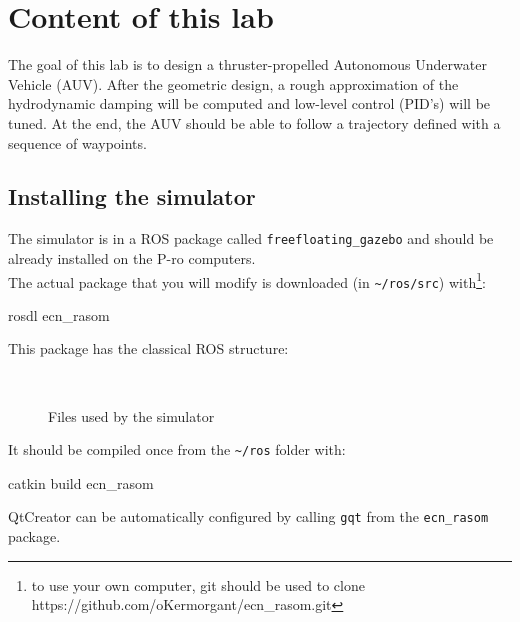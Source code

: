 \documentclass{ecnreport}
\begin{document}


\section{Content of this lab}

The goal of this lab is to design a thruster-propelled Autonomous Underwater Vehicle (AUV). After the geometric design, a rough approximation of the hydrodynamic damping will be computed
and low-level control (PID's) will be tuned. At the end, the AUV should be able to follow a trajectory defined with a sequence of waypoints.

\subsection{Installing the simulator}

The simulator is in a ROS package called \texttt{freefloating\_gazebo} and should be already installed on the P-ro computers.\\
The actual package that you will modify is downloaded (in \texttt{\~{}/ros/src}) with\footnote{to use your own computer, git should be used to clone https://github.com/oKermorgant/ecn\_rasom.git}:
\begin{bashcodelarge}
rosdl ecn_rasom
\end{bashcodelarge}

This package has the classical ROS structure:
\begin{figure}[h]
\begin{minipage}{.25\linewidth} ~ \end{minipage}
\begin{minipage}{.5\linewidth}
\end{minipage}
\caption{Files used by the simulator}
\end{figure}

It should be compiled once from the \texttt{\~{}/ros} folder with:
\begin{bashcodelarge}
catkin build ecn_rasom
\end{bashcodelarge}
QtCreator can be automatically configured by calling \texttt{gqt} from the \texttt{ecn\_rasom} package.
\end{document}
